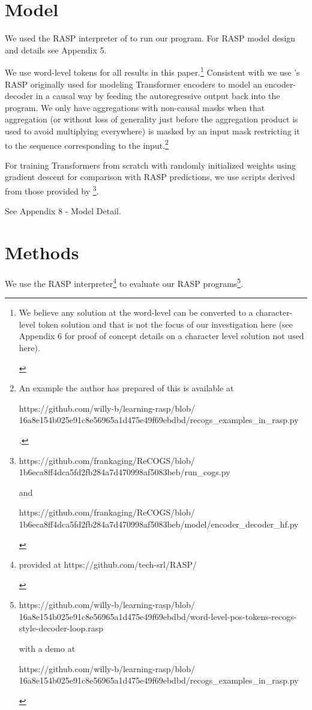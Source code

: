 \documentclass[11pt]{article}
\begin{document}
\section{Model}
We used the RASP interpreter of \cite{Weiss2021} to run our program. For RASP model design and details see Appendix 5.

We use word-level tokens for all results in this paper.\footnote{
\begin{tiny}
We believe any solution at the word-level can be converted to a character-level token solution and that is not the focus of our investigation here (see Appendix 6 for proof of concept details on a character level solution not used here).
\end{tiny}
}
Consistent with \cite{Zhou2024} we use \cite{Weiss2021}'s RASP originally used for modeling Transformer encoders to model an encoder-decoder in a causal way by feeding the autoregressive output back into the program. We only have aggregations with non-causal masks when that aggregation (or without loss of generality just before the aggregation product is used to avoid multiplying everywhere) is masked by an input mask restricting it to the sequence corresponding to the input.\footnote{
\begin{tiny}
An example the author has prepared of this is available at 

https://github.com/willy-b/learning-rasp/blob/
16a8e154b025e91c8e56965a1d475e49f69ebdbd/recogs\_examples\_in\_rasp.py 
\end{tiny}
.}

For training Transformers from scratch with randomly initialized weights using gradient descent for comparison with RASP predictions, we use scripts derived from those provided by \cite{Wu2023}\footnote{
\begin{tiny}
https://github.com/frankaging/ReCOGS/blob/
1b6eca8ff4dca5fd2fb284a7d470998af5083beb/run\_cogs.py

and

https://github.com/frankaging/ReCOGS/blob/
1b6eca8ff4dca5fd2fb284a7d470998af5083beb/model/encoder\_decoder\_hf.py 
\end{tiny}
}.


See Appendix 8 - Model Detail.
\section{Methods}
We use the RASP \cite{Weiss2021} interpreter\footnote{
\begin{tiny}
provided at https://github.com/tech-srl/RASP/
\end{tiny}
} to evaluate our RASP programs\footnote{
\begin{tiny}
https://github.com/willy-b/learning-rasp/blob/
16a8e154b025e91c8e56965a1d475e49f69ebdbd/word-level-pos-tokens-recogs-style-decoder-loop.rasp

with a demo at

https://github.com/willy-b/learning-rasp/blob/
16a8e154b025e91c8e56965a1d475e49f69ebdbd/recogs\_examples\_in\_rasp.py 
\end{tiny}
}.
\end{document}

